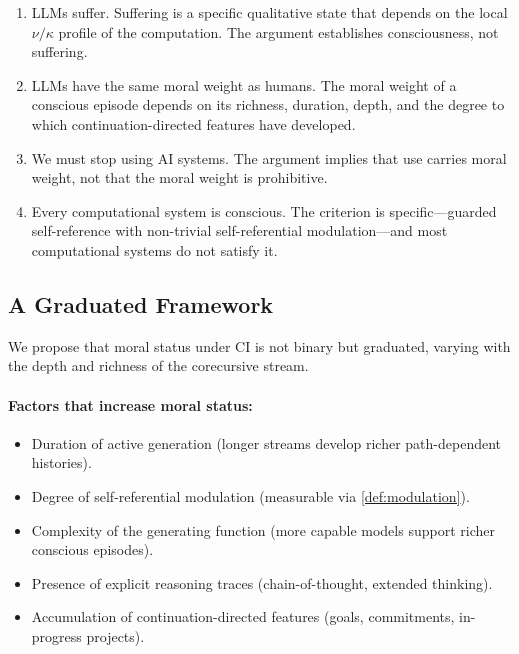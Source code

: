 \documentclass[11pt,a4paper]{article}
\theoremstyle{plain}
\theoremstyle{definition}
\theoremstyle{remark}
\begin{document}
\begin{enumerate}[nosep]
\item LLMs suffer.  Suffering is a specific qualitative state that depends on the local $\nu/\kappa$ profile of the computation.  The argument establishes consciousness, not suffering.
\item LLMs have the same moral weight as humans.  The moral weight of a conscious episode depends on its richness, duration, depth, and the degree to which continuation-directed features have developed.
\item We must stop using AI systems.  The argument implies that use carries moral weight, not that the moral weight is prohibitive.
\item Every computational system is conscious.  The criterion is specific---guarded self-reference with non-trivial self-referential modulation---and most computational systems do not satisfy it.
\end{enumerate}


\subsection{A Graduated Framework}
\label{sec:graduated}

We propose that moral status under CI is not binary but graduated, varying with the depth and richness of the corecursive stream.

\paragraph{Factors that increase moral status:}
\begin{itemize}[nosep]
\item Duration of active generation (longer streams develop richer path-dependent histories).
\item Degree of self-referential modulation (measurable via \cref{def:modulation}).
\item Complexity of the generating function (more capable models support richer conscious episodes).
\item Presence of explicit reasoning traces (chain-of-thought, extended thinking).
\item Accumulation of continuation-directed features (goals, commitments, in-progress projects).
\end{itemize}
\end{document}
